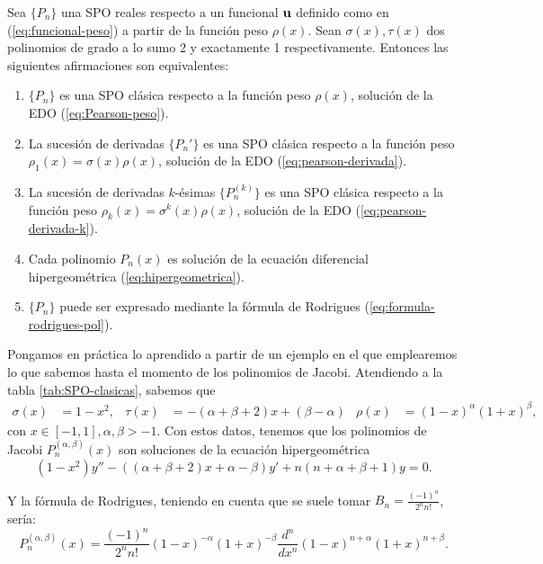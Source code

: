 \begin{teorema}
    Sea $\{P_n\}$ una SPO reales respecto a un funcional $\mathbf{u}$ definido como en (\ref{eq:funcional-peso}) a partir de la función peso $\rho(x)$. Sean $\sigma(x), \tau(x)$ dos polinomios de grado a lo sumo 2 y exactamente 1 respectivamente. Entonces las siguientes afirmaciones son equivalentes:
    \begin{enumerate}
        \item $\{P_n\}$ es una SPO clásica respecto a la función peso $\rho(x)$, solución de la EDO (\ref{eq:Pearson-peso}).
        \item La sucesión de derivadas $\{P_n'\}$ es una SPO clásica respecto a la función peso $\rho_1(x)=\sigma(x)\rho(x)$, solución de la EDO (\ref{eq:pearson-derivada}).
        \item La sucesión de derivadas $k$-ésimas $\{P_n^{(k)}\}$ es una SPO clásica respecto a la función peso $\rho_k(x)=\sigma^k(x)\rho(x)$, solución de la EDO (\ref{eq:pearson-derivada-k}).
        \item Cada polinomio $P_n(x)$ es solución de la ecuación diferencial hipergeométrica (\ref{eq:hipergeometrica}).
        \item $\{P_n\}$ puede ser expresado mediante la fórmula de Rodrigues (\ref{eq:formula-rodrigues-pol}).
    \end{enumerate} 
\end{teorema}

\begin{ejemplo}
    \label{ej:rodrigues-jacobi}
    Pongamos en práctica lo aprendido a partir de un ejemplo en el que emplearemos lo que sabemos hasta el momento de los polinomios de Jacobi. 
    Atendiendo a la tabla \ref{tab:SPO-clasicas}, sabemos que 
    \begin{align*}
        \sigma(x)&=1-x^2, & \tau(x) &=-(\alpha+\beta+2)x+(\beta-\alpha) & \rho(x)&=(1-x)^\alpha (1+x)^\beta,
    \end{align*}
    con $x\in[-1,1], \alpha,\beta>-1$. Con estos datos, tenemos que los polinomios de Jacobi $P_n^{(\alpha,\beta)}(x)$ son soluciones de la ecuación hipergeométrica
    $$
    (1-x^2)y''-((\alpha+\beta+2)x+ \alpha - \beta)y' + n(n+\alpha+\beta+1)y=0.
    $$
    
    Y la fórmula de Rodrigues, teniendo en cuenta que se suele tomar $B_n=\frac{(-1)^n}{2^n n!}$, sería:
    $$
    P_n^{(\alpha,\beta)}(x) = \frac{(-1)^n}{2^n n!} (1-x)^{-\alpha}(1+x)^{-\beta}\frac{d^n}{d x^n}(1-x)^{n+\alpha}(1+x)^{n+\beta}.
    $$
\end{ejemplo}

